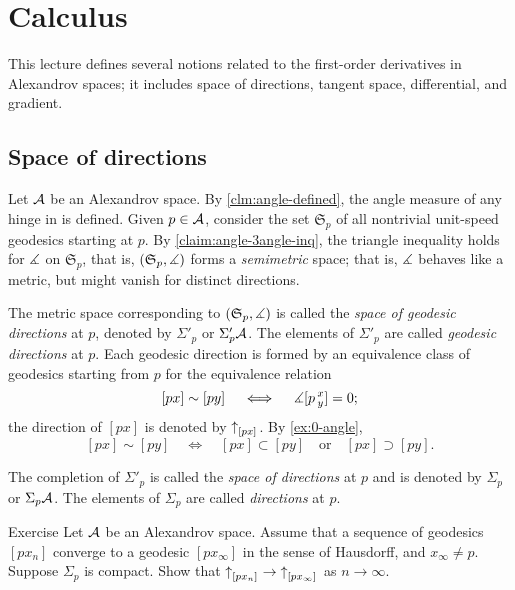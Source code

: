 
\chapter{Calculus}\label{chap:derivative}

This lecture defines several notions related to the first-order derivatives in Alexandrov spaces;
it includes space of directions, tangent space, differential, and gradient.

\section{Space of directions} 
\label{sec:space+directions}

Let $\mathcal{A}$ be an Alexandrov space.
By \ref{clm:angle-defined}, the angle measure of any hinge in is defined.
Given $p\in \mathcal{A}$, consider the set $\mathfrak{S}_p$ of all nontrivial unit-speed geodesics starting at $p$.
By \ref{claim:angle-3angle-inq}, the triangle inequality holds for $\measuredangle$ on $\mathfrak{S}_p$,
that is, $(\mathfrak{S}_p,\measuredangle)$ 
forms a \emph{semimetric} space;
that is, $\measuredangle$ behaves like a metric, but might vanish for distinct directions. 

The metric space corresponding to  $(\mathfrak{S}_p,\measuredangle)$ is called the \emph{space of geodesic directions} at $p$, denoted by $\Sigma'_p$ or $\Sigma'_p\mathcal{A}$.
The elements of $\Sigma'_p$ are called \emph{geodesic directions} at $p$.
Each geodesic direction is formed by an equivalence class of geodesics starting from $p$ 
for the equivalence relation 
\[[px]\sim[py]\quad \iff\quad \measuredangle[p\,{}^{x}_{y}]=0;\]
the direction of $[px]$ is denoted by ${\uparrow}_{[{p}{x}]_{{}}} $.
By \ref{ex:0-angle}, 
\[[px]\sim[py]
\quad\iff\quad
[px]\subset [py]
\quad\text{or}\quad
[px]\supset[py].
\]
 
The completion of $\Sigma'_p$ is called the \emph{space of directions} at $p$ and is denoted by $\Sigma_p$ or $\Sigma_p\mathcal{A}$.
The elements of $\Sigma_p$ are called \emph{directions} at $p$.

\begin{thm}{Exercise}\label{ex:dir-compact}
Let $\mathcal{A}$ be an Alexandrov space.
Assume that a sequence of geodesics $[px_n]$ converge to a geodesic $[px_\infty]$ in the sense of Hausdorff,
and $x_\infty\ne p$.
Suppose $\Sigma_p$ is compact.
Show that ${\uparrow}_{[{p}{x_n}]_{{}}}\to{\uparrow}_{[{p}{x_\infty}]_{{}}}$ as $n\to\infty$.

\end{thm}


